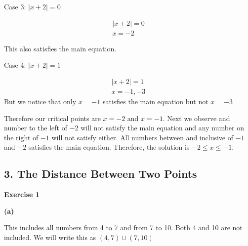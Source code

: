 \documentclass[10pt]{article}
\begin{document}
Case 3: $|x + 2| = 0$

\begin{gather*}
  |x + 2| = 0\\
  x = -2
\end{gather*}

This also satisfies the main equation. 

Case 4: $|x + 2| = 1$

\begin{gather*}
  |x + 2| = 1\\
  x = -1, -3
\end{gather*}
But we notice that only $x = -1$ satisfies the main equation but not $x = -3$

Therefore our critical points are $x = -2$ and $x = -1$. Next we observe and number to the left of $-2$ will not satisfy 
the main equation and any number on the right of $-1$ will not satisfy either. All numbers between and inclusive of $-1$ and $-2$ satisfies 
the main equation. Therefore, the solution is $-2 \le x \le -1$.


\subsection{3. The Distance Between Two Points}

\textbf{Exercise 1}

\textbf{(a)}

This includes all numbers from 4 to 7 and from 7 to 10. Both 4 and 10 are not included. We will write this as 
$(4, 7) \cup (7, 10)$

\begin{center}
\end{center}
\end{document}

